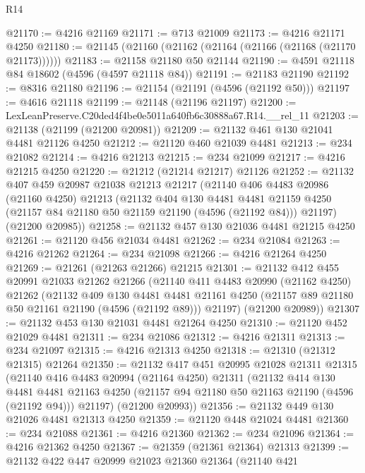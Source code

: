 \begin{lexlean}{R14}
\begin{coremodule}
@21170 := @4216 @21169
@21171 := @713 @21009
@21173 := @4216 @21171 @4250
@21180 := @21145 (@21160 (@21162 (@21164 (@21166 (@21168 (@21170 @21173))))))
@21183 := @21158 @21180 @50 @21144
@21190 := @4591 @21118 @84 @18602 (@4596 (@4597 @21118 @84))
@21191 := @21183 @21190
@21192 := @8316 @21180
@21196 := @21154 (@21191 (@4596 (@21192 @50)))
@21197 := @4616 @21118
@21199 := @21148 (@21196 @21197)
@21200 := LexLeanPreserve.C20ded4f4be0e5011a640fb6c30888a67.R14.__rel_11
@21203 := @21138 (@21199 (@21200 @20981))
@21209 := @21132 @461 @130 @21041 @4481 @21126 @4250
@21212 := @21120 @460 @21039 @4481
@21213 := @234 @21082
@21214 := @4216 @21213
@21215 := @234 @21099
@21217 := @4216 @21215 @4250
@21220 := @21212 (@21214 @21217) @21126
@21252 := @21132
    @407
    @459
    @20987
    @21038
    @21213
    @21217
    (@21140
      @406
      @4483
      @20986
      (@21160 @4250)
      @21213
      (@21132
        @404
        @130
        @4481
        @4481
        @21159
        @4250
        (@21157 @84 @21180 @50 @21159 @21190 (@4596 (@21192 @84)))
        @21197)
      (@21200 @20985))
@21258 := @21132 @457 @130 @21036 @4481 @21215 @4250
@21261 := @21120 @456 @21034 @4481
@21262 := @234 @21084
@21263 := @4216 @21262
@21264 := @234 @21098
@21266 := @4216 @21264 @4250
@21269 := @21261 (@21263 @21266) @21215
@21301 := @21132
    @412
    @455
    @20991
    @21033
    @21262
    @21266
    (@21140
      @411
      @4483
      @20990
      (@21162 @4250)
      @21262
      (@21132
        @409
        @130
        @4481
        @4481
        @21161
        @4250
        (@21157 @89 @21180 @50 @21161 @21190 (@4596 (@21192 @89)))
        @21197)
      (@21200 @20989))
@21307 := @21132 @453 @130 @21031 @4481 @21264 @4250
@21310 := @21120 @452 @21029 @4481
@21311 := @234 @21086
@21312 := @4216 @21311
@21313 := @234 @21097
@21315 := @4216 @21313 @4250
@21318 := @21310 (@21312 @21315) @21264
@21350 := @21132
    @417
    @451
    @20995
    @21028
    @21311
    @21315
    (@21140
      @416
      @4483
      @20994
      (@21164 @4250)
      @21311
      (@21132
        @414
        @130
        @4481
        @4481
        @21163
        @4250
        (@21157 @94 @21180 @50 @21163 @21190 (@4596 (@21192 @94)))
        @21197)
      (@21200 @20993))
@21356 := @21132 @449 @130 @21026 @4481 @21313 @4250
@21359 := @21120 @448 @21024 @4481
@21360 := @234 @21088
@21361 := @4216 @21360
@21362 := @234 @21096
@21364 := @4216 @21362 @4250
@21367 := @21359 (@21361 @21364) @21313
@21399 := @21132
    @422
    @447
    @20999
    @21023
    @21360
    @21364
    (@21140
      @421

\end{coremodule}
\end{lexlean}
